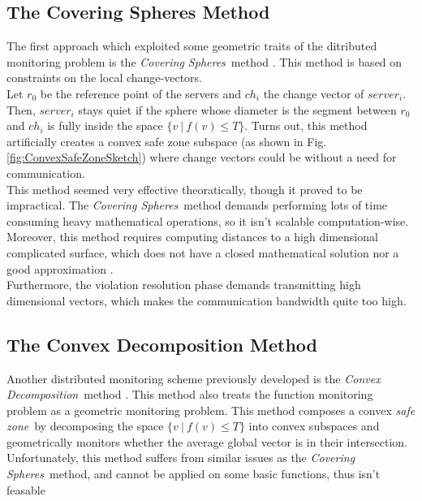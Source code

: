 \documentclass[10pt, conference]{IEEEtran}
\newcommand{\coveringSpheres}{\textit{Covering Spheres}}
\newcommand{\convexDecomposition}{\textit{Convex Decomposition}}
\newcommand{\safeZone}{\textit{safe zone}}
\begin{document}
\subsection{The Covering Spheres Method}
The first approach which exploited some geometric traits of the ditributed monitoring problem is the \coveringSpheres \ method \cite{sharfman2007geometric}. This method is based on constraints on the local change-vectors. \\
Let $r_0$ be the reference point of the servers and $ch_i$ the change vector of $server_i$. Then, $server_i$ stays quiet if the sphere whose diameter is the segment between $r_0$ and $ch_i$ is fully inside the space ${\{v \ | \ f(v) \leq T\}}$. Turns out, this method artificially creates a convex safe zone subspace (as shown in Fig. \ref{fig:ConvexSafeZoneSketch}) where change vectors could be without a need for communication. \\
This method seemed very effective theoratically, though it proved to be impractical. The \coveringSpheres \ method demands performing lots of time consuming heavy mathematical operations, so it isn't scalable computation-wise. Moreover, this method requires computing distances to a high dimensional complicated surface, which does not have a closed mathematical solution nor a good approximation \cite{lazerson2018lightweight}. \\
Furthermore, the violation resolution phase demands transmitting high dimensional vectors, which makes the communication bandwidth quite too high.
\subsection{The Convex Decomposition Method}
Another distributed monitoring scheme previously developed is the \convexDecomposition \ method \cite{lazerson2015monitoring}. This method also treats the function monitoring problem as a geometric monitoring problem. This method composes a convex \safeZone \ by decomposing the space ${\{v \ | \ f(v) \leq T\}}$ into convex subspaces and geometrically monitors whether the average global vector is in their intersection. \\
Unfortunately, this method suffers from similar issues as the \coveringSpheres \ method, and cannot be applied on some basic functions, thus isn't feasable \cite{lazerson2018lightweight}
\end{document}
